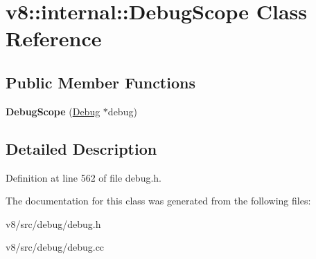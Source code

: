 \hypertarget{classv8_1_1internal_1_1DebugScope}{}\section{v8\+:\+:internal\+:\+:Debug\+Scope Class Reference}
\label{classv8_1_1internal_1_1DebugScope}
\subsection*{Public Member Functions}
\begin{DoxyCompactItemize}
\item 
\mbox{\label{classv8_1_1internal_1_1DebugScope_ab470ff3fe22c196e837db04a750efa3c}} 
{\bfseries Debug\+Scope} (\mbox{\hyperlink{classv8_1_1internal_1_1Debug}{Debug}} $\ast$debug)
\end{DoxyCompactItemize}


\subsection{Detailed Description}


Definition at line 562 of file debug.\+h.



The documentation for this class was generated from the following files\+:\begin{DoxyCompactItemize}
\item 
v8/src/debug/debug.\+h\item 
v8/src/debug/debug.\+cc\end{DoxyCompactItemize}
